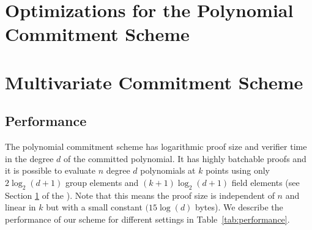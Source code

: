 \section{Optimizations for the Polynomial Commitment Scheme}
\label{subsec:optimization}

\section{Multivariate Commitment Scheme}
\label{sec:multivariate}



\subsection{Performance}
The polynomial commitment scheme has logarithmic proof size and verifier time in the degree $d$ of the committed polynomial. 
It has highly batchable proofs and it is possible to evaluate $n$ degree $d$ polynomials at $k$ points using only $2\log_2(d+1)$ group elements and $(k+1)\log_2(d+1)$ field elements (see Section \ref{subsec:optimization} of the \appendixphrase). Note that this means the proof size is independent of $n$ and linear in $k$ but with a small constant $(15 \log(d)$ bytes). 
We describe the performance of our scheme for different settings in Table~\ref{tab:performance}.

